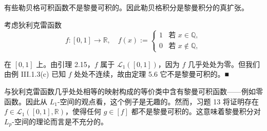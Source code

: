 \begin{corollary}

有些勒贝格可积函数不是黎曼可积的。因此勒贝格积分是黎曼积分的真扩张。

\proofhead
考虑狄利克雷函数
\begin{equation*}
f: [0,1] \to \mathbb{R}, \quad f(x) := \begin{cases} 1 & \text{若 } x \in \mathbb{Q}, \\ 0 & \text{若 } x \notin \mathbb{Q}, \end{cases}
\end{equation*}

在 $ [0,1] $ 上。由引理 2.15，$ f $ 属于 $ \mathcal{L}_1([0,1]) $，因为 $ f $ 几乎处处为零。但我们由例 III.1.3(c) 已知 $ f $ 处处不连续，故由定理 5.6 它不是黎曼可积的。\nobreak\hspace{0.35em}■

\end{corollary}

与狄利克雷函数几乎处处相等的映射构成的等价类中含有黎曼可积函数——例如零函数。因此从 $ L_1 $-空间的观点看，这个例子是无趣的。然而，习题 13 将证明存在 $ f \in \mathcal{L}_1([0,1],\mathbb{R}) $，使得任何 $ g \in [f] $ 都不是黎曼可积的。这意味着黎曼积分对 $ L_p $-空间的理论而言是不充分的。

\exerciseshead

